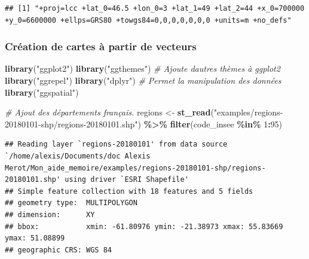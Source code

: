 \documentclass[
  french,
]{book}
\newenvironment{Shaded}{\begin{snugshade}}{\end{snugshade}}
\newcommand{\CommentTok}[1]{\textcolor[rgb]{0.56,0.35,0.01}{\textit{#1}}}
\newcommand{\DecValTok}[1]{\textcolor[rgb]{0.00,0.00,0.81}{#1}}
\newcommand{\KeywordTok}[1]{\textcolor[rgb]{0.13,0.29,0.53}{\textbf{#1}}}
\newcommand{\NormalTok}[1]{#1}
\newcommand{\OperatorTok}[1]{\textcolor[rgb]{0.81,0.36,0.00}{\textbf{#1}}}
\newcommand{\StringTok}[1]{\textcolor[rgb]{0.31,0.60,0.02}{#1}}
\begin{document}
\begin{Shaded}
\end{Shaded}

\begin{verbatim}
## [1] "+proj=lcc +lat_0=46.5 +lon_0=3 +lat_1=49 +lat_2=44 +x_0=700000 +y_0=6600000 +ellps=GRS80 +towgs84=0,0,0,0,0,0,0 +units=m +no_defs"
\end{verbatim}

\hypertarget{cruxe9ation-de-cartes-uxe0-partir-de-vecteurs}{%
\subsubsection{Création de cartes à partir de vecteurs}\label{cruxe9ation-de-cartes-uxe0-partir-de-vecteurs}}



\begin{Shaded}
\begin{Highlighting}[]
\KeywordTok{library}\NormalTok{(}\StringTok{"ggplot2"}\NormalTok{)}
\KeywordTok{library}\NormalTok{(}\StringTok{"ggthemes"}\NormalTok{) }\CommentTok{\# Ajoute d\textquotesingle{}autres thèmes à ggplot2}
\KeywordTok{library}\NormalTok{(}\StringTok{"ggrepel"}\NormalTok{)}
\KeywordTok{library}\NormalTok{(}\StringTok{"dplyr"}\NormalTok{) }\CommentTok{\# Permet la manipulation des données}
\KeywordTok{library}\NormalTok{(}\StringTok{"ggspatial"}\NormalTok{)}

\CommentTok{\# Ajout des départements français.}
\NormalTok{regions \textless{}{-}}\StringTok{ }\KeywordTok{st\_read}\NormalTok{(}\StringTok{"examples/regions{-}20180101{-}shp/regions{-}20180101.shp"}\NormalTok{) }\OperatorTok{\%\textgreater{}\%}
\StringTok{  }\KeywordTok{filter}\NormalTok{(code\_insee }\OperatorTok{\%in\%}\StringTok{ }\DecValTok{1}\OperatorTok{:}\DecValTok{95}\NormalTok{)}
\end{Highlighting}
\end{Shaded}

\begin{verbatim}
## Reading layer `regions-20180101' from data source `/home/alexis/Documents/doc Alexis Merot/Mon_aide_memoire/examples/regions-20180101-shp/regions-20180101.shp' using driver `ESRI Shapefile'
## Simple feature collection with 18 features and 5 fields
## geometry type:  MULTIPOLYGON
## dimension:      XY
## bbox:           xmin: -61.80976 ymin: -21.38973 xmax: 55.83669 ymax: 51.08899
## geographic CRS: WGS 84
\end{verbatim}
\end{document}
